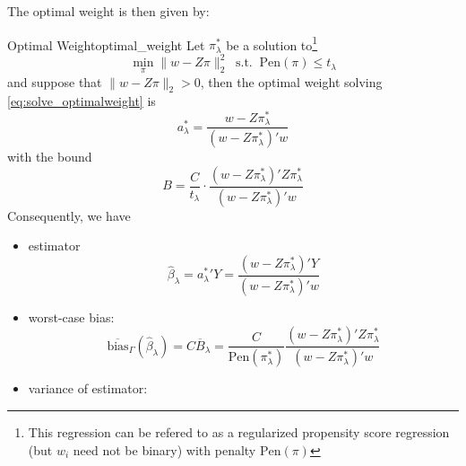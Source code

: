 \documentclass[twoside]{article}
\let\bar\overline
\theoremstyle{definition}
\begin{document}
The optimal weight is then given by:
\begin{theorem}{Optimal Weight}{optimal_weight}
  Let $\pi^*_{\lambda}$ be a solution to\footnote{This regression can be refered to as a regularized propensity score regression (but $w_i$ need not be binary) with penalty $\mathrm{Pen}(\pi)$}
  $$ \min_{\pi}\lVert w-Z\pi \rVert^2_2 \ \text{ s.t. }\ \mathrm{Pen}(\pi)\leq t_{\lambda} $$
  and suppose that $\lVert w-Z\pi \rVert_2>0$, then the optimal weight solving \ref{eq:solve_optimalweight} is $$ a^*_{\lambda}=\frac{w-Z\pi_{\lambda}^*}{\left(w-Z\pi_{\lambda}^*\right)'w} $$
  with the bound $$ B=\frac{C}{t_{\lambda}}\cdot \frac{\left(w-Z\pi_{\lambda}^*\right)' Z\pi^*_{\lambda}}{\left(w-Z\pi_{\lambda}^*\right)'w} $$
  Consequently, we have 
  \begin{itemize}
    \item estimator $$ \hat{\beta}_{\lambda} = {a^*_{\lambda}}' Y= \frac{\left( w-Z\pi_{\lambda}^* \right)'Y}{\left(w-Z\pi_{\lambda}^*\right)'w} $$
    \item worst-case bias: $$ \bar{\mathrm{bias}}_{\Gamma}\left(\hat{\beta}_{\lambda}\right) = C\bar{B}_{\lambda} = \frac{C}{\mathrm{Pen}(\pi^*_{\lambda})}  \frac{\left( w-Z\pi_{\lambda}^* \right)'Z\pi^*_{\lambda}}{\left(w-Z\pi_{\lambda}^*\right)'w}$$
    \item variance of estimator:
  \end{itemize}
\end{theorem}

\newpage


\end{document}
